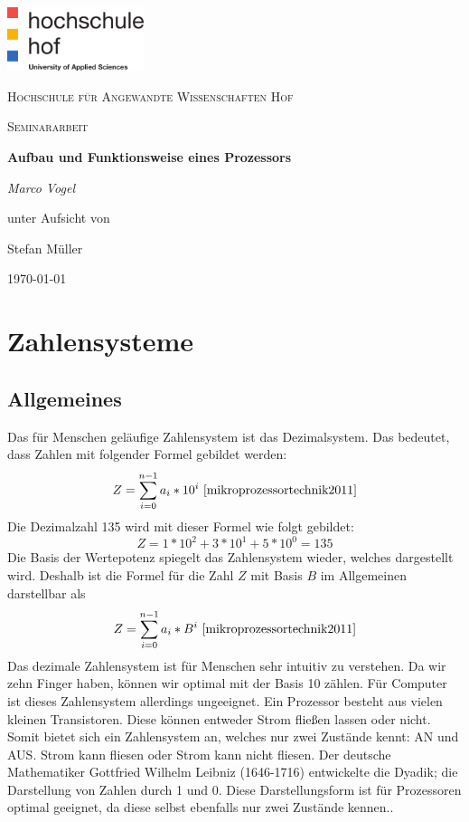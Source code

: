 \documentclass[a4paper,12pt]{article}
\begin{document}
\begin{titlepage}
	\centering
	\includegraphics[width=0.3\textwidth]{logo}\par\vspace{1cm}
	{\scshape\LARGE Hochschule für Angewandte Wissenschaften Hof \par}
	\vspace{1cm}
	{\scshape\Large Seminararbeit\par}
	\vspace{1.5cm}
	{\huge\bfseries Aufbau und Funktionsweise eines Prozessors\par}
	\vspace{2cm}
	{\Large\itshape Marco Vogel\par}
	\vfill
	unter Aufsicht von\par
	Stefan Müller
	\vfill
	{\large\today\par}
\end{titlepage}
\newpage

\pagestyle{empty} 
\tableofcontents
\newpage
\pagestyle{fancy}
\fancyhf{}
\fancyhead[L]{\rightmark}
\fancyhead[R]{\thepage}
\renewcommand{\headrulewidth}{1pt}
\setlength{\footnotemargin}{0pt}
\setcounter{page}{1}


\section{Zahlensysteme}

\subsection{Allgemeines}
Das für Menschen geläufige Zahlensystem ist das Dezimalsystem. Das bedeutet, dass Zahlen mit folgender Formel gebildet werden:
$$Z=\sum\limits_{i=0}^{n-1} a_i * 10^i \ \cite{mikroprozessortechnik2011}$$
Die Dezimalzahl 135 wird mit dieser Formel wie folgt gebildet:$$Z=1*10^2+3*10^1+5*10^0 = 135$$
Die Basis der Wertepotenz spiegelt das Zahlensystem wieder, welches dargestellt wird. Deshalb ist die Formel für die Zahl $Z$ mit Basis $B$ im Allgemeinen darstellbar als
$$Z=\sum\limits_{i=0}^{n-1} a_i * B^i \ \cite{mikroprozessortechnik2011}$$ 
Das dezimale Zahlensystem ist für Menschen sehr intuitiv zu verstehen. Da wir zehn Finger haben, können wir optimal mit der Basis 10 zählen. Für Computer ist dieses Zahlensystem allerdings ungeeignet. Ein Prozessor besteht aus vielen kleinen Transistoren. Diese können entweder Strom fließen lassen oder nicht. Somit bietet sich ein Zahlensystem an, welches nur zwei Zustände kennt: AN und AUS. Strom kann fliesen oder Strom kann nicht fliesen. Der deutsche Mathematiker Gottfried Wilhelm Leibniz (1646-1716) entwickelte die Dyadik; die Darstellung von Zahlen durch 1 und 0. Diese Darstellungsform ist für Prozessoren optimal geeignet, da diese selbst ebenfalls nur zwei Zustände kennen.\cite{mikroprozessortechnik2011}.
\end{document}
